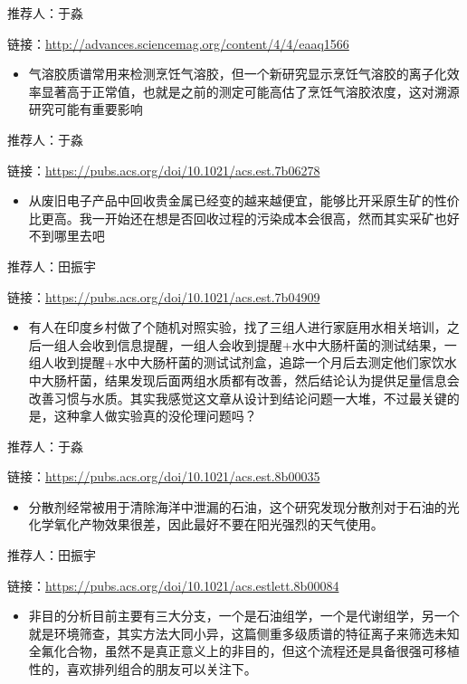 \documentclass[]{book}
\providecommand{\tightlist}{%
  \setlength{\itemsep}{0pt}\setlength{\parskip}{0pt}}
\begin{document}
推荐人：于淼

链接：\url{http://advances.sciencemag.org/content/4/4/eaaq1566}

\begin{itemize}
\tightlist
\item
  气溶胶质谱常用来检测烹饪气溶胶，但一个新研究显示烹饪气溶胶的离子化效率显著高于正常值，也就是之前的测定可能高估了烹饪气溶胶浓度，这对溯源研究可能有重要影响
\end{itemize}

推荐人：于淼

链接：\url{https://pubs.acs.org/doi/10.1021/acs.est.7b06278}

\begin{itemize}
\tightlist
\item
  从废旧电子产品中回收贵金属已经变的越来越便宜，能够比开采原生矿的性价比更高。我一开始还在想是否回收过程的污染成本会很高，然而其实采矿也好不到哪里去吧
\end{itemize}

推荐人：田振宇

链接：\url{https://pubs.acs.org/doi/10.1021/acs.est.7b04909}

\begin{itemize}
\tightlist
\item
  有人在印度乡村做了个随机对照实验，找了三组人进行家庭用水相关培训，之后一组人会收到信息提醒，一组人会收到提醒+水中大肠杆菌的测试结果，一组人收到提醒+水中大肠杆菌的测试试剂盒，追踪一个月后去测定他们家饮水中大肠杆菌，结果发现后面两组水质都有改善，然后结论认为提供足量信息会改善习惯与水质。其实我感觉这文章从设计到结论问题一大堆，不过最关键的是，这种拿人做实验真的没伦理问题吗？
\end{itemize}

推荐人：于淼

链接：\url{https://pubs.acs.org/doi/10.1021/acs.est.8b00035}

\begin{itemize}
\tightlist
\item
  分散剂经常被用于清除海洋中泄漏的石油，这个研究发现分散剂对于石油的光化学氧化产物效果很差，因此最好不要在阳光强烈的天气使用。
\end{itemize}

推荐人：田振宇

链接：\url{https://pubs.acs.org/doi/10.1021/acs.estlett.8b00084}

\begin{itemize}
\tightlist
\item
  非目的分析目前主要有三大分支，一个是石油组学，一个是代谢组学，另一个就是环境筛查，其实方法大同小异，这篇侧重多级质谱的特征离子来筛选未知全氟化合物，虽然不是真正意义上的非目的，但这个流程还是具备很强可移植性的，喜欢排列组合的朋友可以关注下。
\end{itemize}
\end{document}
